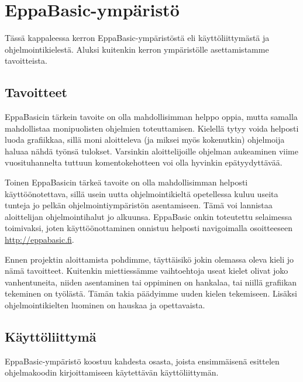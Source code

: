 \section{EppaBasic-ympäristö}

Tässä kappaleessa kerron EppaBasic-ympäristöstä
eli käyttöliittymästä ja ohjelmointikielestä.
Aluksi kuitenkin kerron ympäristölle
asettamistamme tavoitteista.

\subsection{Tavoitteet}
EppaBasicin tärkein tavoite on olla
mahdollisimman helppo oppia,
mutta samalla mahdollistaa
monipuolisten ohjelmien toteuttamisen.
Kielellä tytyy voida helposti luoda grafiikkaa,
sillä moni aloitteleva (ja miksei myös kokenutkin)
ohjelmoija haluaa nähdä työnsä tulokset.
Varsinkin aloittelijoille ohjelman aukeaminen
viime vuosituhannelta tuttuun komentokehotteen
voi olla hyvinkin epätyydyttävää.

Toinen EppaBasicin tärkeä tavoite on olla
mahdollisimman helposti käyttöönotettava,
sillä usein uutta ohjelmointikieltä opetellessa
kuluu useita tunteja jo pelkän
ohjelmointiympäristön asentamiseen.
Tämä voi lannistaa aloittelijan
ohjelmointihalut jo alkuunsa.
EppaBasic onkin toteutettu
selaimessa toimivaksi, joten
käyttöönottaminen onnistuu
helposti navigoimalla osoitteeseen
\url{http://eppabasic.fi}.

Ennen projektin aloittamista pohdimme,
täyttäisikö jokin olemassa oleva
kieli jo nämä tavoitteet.
Kuitenkin miettiessämme vaihtoehtoja
useat kielet olivat joko vanhentuneita,
niiden asentaminen tai oppiminen on hankalaa,
tai niillä grafiikan tekeminen on työlästä.
Tämän takia päädyimme uuden kielen tekemiseen.
Lisäksi ohjelmointikielten luominen on hauskaa
ja opettavaista.

\subsection{Käyttöliittymä}
EppaBasic-ympäristö koostuu kahdesta osasta,
joista ensimmäisenä esittelen ohjelmakoodin
kirjoittamiseen käytettävän käyttöliittymän.

